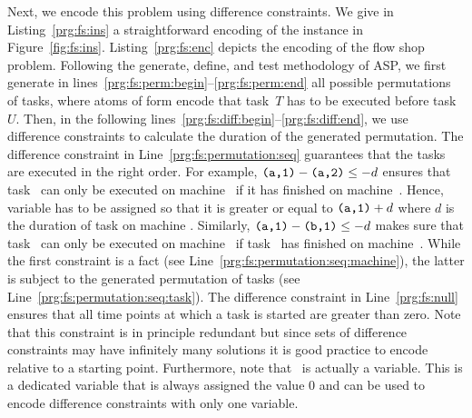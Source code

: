 \begin{example}


%
Next, we encode this problem using difference constraints.
We give in Listing~\ref{prg:fs:ins} a straightforward encoding of the instance in Figure~\ref{fig:fs:ins}.
Listing~\ref{prg:fs:enc} depicts the encoding of the flow shop problem.
Following the generate, define, and test methodology of ASP,
we first generate in lines~\ref{prg:fs:perm:begin}--\ref{prg:fs:perm:end} all possible permutations of tasks,
where atoms of form  encode that task~$T$ has to be executed before task~$U$.
Then, in the following lines~\ref{prg:fs:diff:begin}--\ref{prg:fs:diff:end},
we use difference constraints to calculate the duration of the generated permutation.
%
The difference constraint in Line~\ref{prg:fs:permutation:seq} guarantees that the tasks are executed in the right order.
For example, $\texttt{(a,1)} - \texttt{(a,2)} \leq -d$ ensures that task~ can only be executed on machine~ if it has finished on machine~.
Hence, variable  has to be assigned so that it is greater or equal to $\texttt{(a,1)}+d$ where $d$ is the duration of task  on machine .
Similarly, $\texttt{(a,1)} - \texttt{(b,1)} \leq -d$ makes sure that task~ can only be executed on machine~ if task~ has finished on machine~.
While the first constraint is a fact (see Line~\ref{prg:fs:permutation:seq:machine}),
the latter is subject to the generated permutation of tasks (see Line~\ref{prg:fs:permutation:seq:task}).
%
The difference constraint in Line~\ref{prg:fs:null} ensures that all time points at which a task is started are greater than zero.
Note that this constraint is in principle redundant
but since sets of difference constraints may have infinitely many solutions
it is good practice to encode relative to a starting point.
Furthermore, note that~ is actually a variable.
This is a dedicated variable that is always assigned the value 0 and can be used to encode difference constraints with only one variable.


\end{example}
